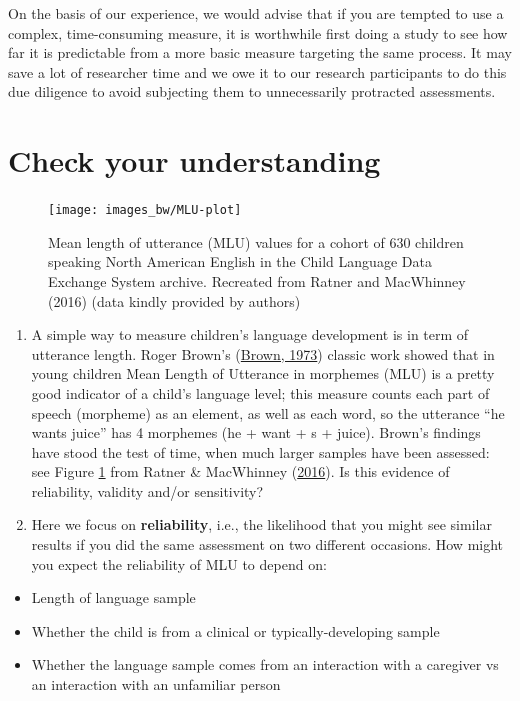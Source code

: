\documentclass{krantz}
\providecommand{\tightlist}{%
\setlength{\itemsep}{0pt}\setlength{\parskip}{0pt}}
\begin{document}
On the basis of our experience, we would advise that if you are tempted to use a complex, time-consuming measure, it is worthwhile first doing a study to see how far it is predictable from a more basic measure targeting the same process. It may save a lot of researcher time and we owe it to our research participants to do this due diligence to avoid subjecting them to unnecessarily protracted assessments.

\hypertarget{check-your-understanding-2}{%
\section{Check your understanding}\label{check-your-understanding-2}}

\begin{figure}
\texttt{[image: images\_bw/MLU-plot]} \caption{Mean length of utterance (MLU) values for a cohort of 630 children speaking North American English in the Child Language Data Exchange System archive. Recreated from Ratner and MacWhinney (2016) (data kindly provided by authors)}\label{fig:MLU-plot}
\end{figure}

\begin{enumerate}
\def\labelenumi{\arabic{enumi}.}
\item
  A simple way to measure children's language development is in term of utterance length. Roger Brown's (\protect\hyperlink{ref-brown1973}{Brown, 1973}) classic work showed that in young children Mean Length of Utterance in morphemes (MLU) is a pretty good indicator of a child's language level; this measure counts each part of speech (morpheme) as an element, as well as each word, so the utterance ``he wants juice'' has 4 morphemes (he + want + s + juice). Brown's findings have stood the test of time, when much larger samples have been assessed: see Figure \ref{fig:MLU-plot} from Ratner \& MacWhinney (\protect\hyperlink{ref-ratner2016}{2016}). Is this evidence of reliability, validity and/or sensitivity?
\item
  Here we focus on \textbf{reliability}, i.e., the likelihood that you might see similar results if you did the same assessment on two different occasions. How might you expect the reliability of MLU to depend on:
\end{enumerate}

\begin{itemize}
\tightlist
\item
  Length of language sample
\item
  Whether the child is from a clinical or typically-developing sample
\item
  Whether the language sample comes from an interaction with a caregiver vs an interaction with an unfamiliar person
\end{itemize}
\end{document}

